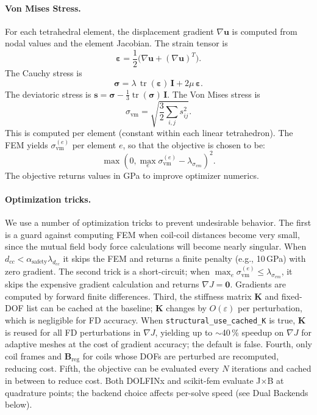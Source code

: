 \paragraph{Von Mises Stress.}
For each tetrahedral element, the displacement gradient $\nabla \mathbf{u}$ is computed from nodal values and the element Jacobian. The strain tensor is
\begin{equation}
  \boldsymbol{\varepsilon} = \frac{1}{2}\bigl(\nabla \mathbf{u} + (\nabla \mathbf{u})^T\bigr).
\end{equation}
The Cauchy stress is
\begin{equation}
  \boldsymbol{\sigma} = \lambda \, \operatorname{tr}(\boldsymbol{\varepsilon}) \, \mathbf{I} + 2\mu \, \boldsymbol{\varepsilon}.
\end{equation}
The deviatoric stress is $\mathbf{s} = \boldsymbol{\sigma} - \frac{1}{3}\operatorname{tr}(\boldsymbol{\sigma}) \, \mathbf{I}$. The Von Mises stress is
\begin{equation}
  \sigma_{\text{vm}}
  = \sqrt{\frac{3}{2} \sum_{i,j} s_{ij}^2}.
\end{equation}
This is computed per element (constant within each linear tetrahedron).
The FEM yields $\sigma_{\text{vm}}^{(e)}$ per element $e$, so that the objective is chosen to be:
\begin{equation}
  \max(0, \max_e \sigma_{\text{vm}}^{(e)} - \lambda_{\sigma_{vm}})^2.
\end{equation}
The objective returns values in GPa to improve optimizer numerics.

\paragraph{Optimization tricks.}
We use a number of optimization tricks to prevent undesirable behavior.
The first is a guard against computing FEM when coil-coil distances become very small, since the mutual field body force calculations will become nearly singular. When $d_{cc} < \alpha_\text{safety}\lambda_{d_{cc}}$ it skips the FEM and returns a finite penalty (e.g., 10\,GPa) with zero gradient.
The second trick is a short-circuit; when $\max_e \sigma_{\text{vm}}^{(e)} \leq \lambda_{\sigma_{vm}}$, it skips the expensive gradient calculation and returns $\nabla J = \mathbf{0}$.
Gradients are computed by forward finite differences.
Third, the stiffness matrix $\mathbf{K}$ and fixed-DOF list can be cached at the baseline; $\mathbf{K}$ changes by $O(\varepsilon)$ per perturbation, which is negligible for FD accuracy. When \texttt{structural\_use\_cached\_K} is true, $\mathbf{K}$ is reused for all FD perturbations in $\nabla J$, yielding up to $\sim$40\,\% speedup on $\nabla J$ for adaptive meshes at the cost of gradient accuracy; the default is false.
Fourth, only coil frames and $\mathbf{B}_{\text{reg}}$ for coils whose DOFs are perturbed are recomputed, reducing cost.
Fifth, the objective can be evaluated every $N$ iterations and cached in between to reduce cost.
Both DOLFINx and scikit-fem evaluate J$\times$B at quadrature points; the backend choice affects per-solve speed (see Dual Backends below).

